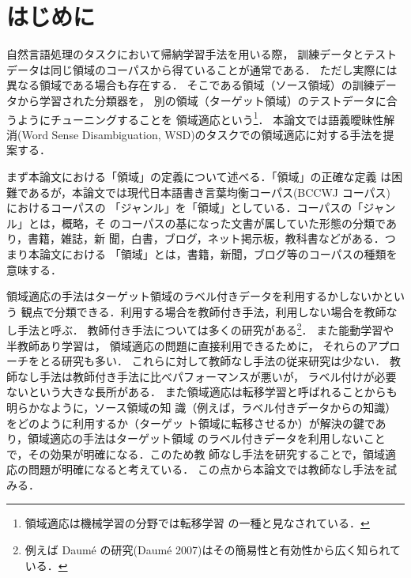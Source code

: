 \documentclass[japanese]{jnlp_1.4}
\begin{document}
\maketitle



\section{はじめに}


自然言語処理のタスクにおいて帰納学習手法を用いる際，
訓練データとテストデータは同じ領域のコーパスから得ていることが通常である．
ただし実際には異なる領域である場合も存在する．
そこである領域（ソース領域）の訓練データから学習された分類器を，
別の領域（ターゲット領域）のテストデータに合うようにチューニングすることを
領域適応という\footnote{領域適応は機械学習の分野では転移学習
\cite{kamishima}の一種と見なされている．}．
本論文では語義曖昧性解消(Word Sense Disambiguation, WSD)のタスクでの領域適応に対する手法を提案する．

まず本論文における「領域」の定義について述べる．「領域」の正確な定義
は困難であるが，本論文では現代日本語書き言葉均衡コーパス(BCCWJ コーパス)\cite{bccwj}
におけるコーパスの
「ジャンル」を「領域」としている．コーパスの「ジャンル」とは，概略，そ
のコーパスの基になった文書が属していた形態の分類であり，書籍，雑誌，新
聞，白書，ブログ，ネット掲示板，教科書などがある．つまり本論文における
「領域」とは，書籍，新聞，ブログ等のコーパスの種類を意味する．

領域適応の手法はターゲット領域のラベル付きデータを利用するかしないかという
観点で分類できる．利用する場合を教師付き手法，利用しない場合を教師なし手法と呼ぶ．
教師付き手法については多くの研究がある\footnote{
    例えば Daum{\'e} の研究(Daum\'{e} 2007)\nocite{daume0}はその簡易性と有効性から広く知られている．}．
また能動学習\cite{settles2010active}や半教師あり学習\cite{chapelle2006semi}は，
領域適応の問題に直接利用できるために，
それらのアプローチをとる研究も多い．
これらに対して教師なし手法の従来研究は少ない．
教師なし手法は教師付き手法に比べパフォーマンスが悪いが，
ラベル付けが必要ないという大きな長所がある．
また領域適応は転移学習と呼ばれることからも明らかなように，ソース領域の知
識（例えば，ラベル付きデータからの知識）をどのように利用するか（ターゲッ
ト領域に転移させるか）が解決の鍵であり，領域適応の手法はターゲット領域
のラベル付きデータを利用しないことで，その効果が明確になる．このため教
師なし手法を研究することで，領域適応の問題が明確になると考えている．
この点から本論文では教師なし手法を試みる．
\newpage
\end{document}
